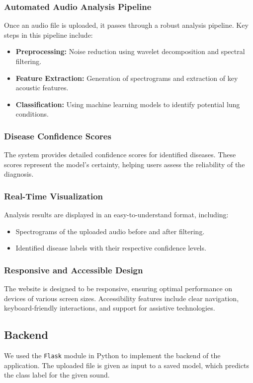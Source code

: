 \documentclass[conference]{IEEEtran}
\begin{document}
{\subsubsection{Automated Audio Analysis Pipeline}
Once an audio file is uploaded, it passes through a robust analysis pipeline. Key steps in this pipeline include:
\begin{itemize}
    \item \textbf{Preprocessing:} Noise reduction using wavelet decomposition and spectral filtering.
    \item \textbf{Feature Extraction:} Generation of spectrograms and extraction of key acoustic features.
    \item \textbf{Classification:} Using machine learning models to identify potential lung conditions.
\end{itemize}

\subsubsection{Disease Confidence Scores}
The system provides detailed confidence scores for identified diseases. These scores represent the model's certainty, helping users assess the reliability of the diagnosis.

\subsubsection{Real-Time Visualization}
Analysis results are displayed in an easy-to-understand format, including:
\begin{itemize}
    \item Spectrograms of the uploaded audio before and after filtering.
    \item Identified disease labels with their respective confidence levels.
\end{itemize}

\subsubsection{Responsive and Accessible Design}
The website is designed to be responsive, ensuring optimal performance on devices of various screen sizes. Accessibility features include clear navigation, keyboard-friendly interactions, and support for assistive technologies.


\subsection{Backend}
	We used the \texttt{Flask} module in Python to implement the backend of the application. The uploaded file is given as input to a saved model, which predicts the class label for the given sound.
	
}
\end{document}
